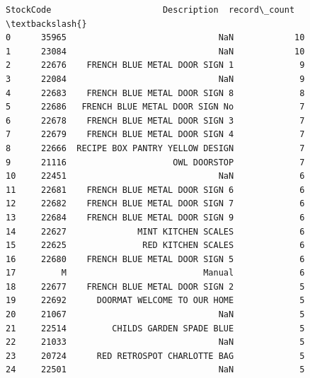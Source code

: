 \documentclass[11pt]{article}
\begin{document}
    
    \begin{Verbatim}[commandchars=\\\{\}]
   StockCode                      Description  record\_count  \textbackslash{}
0      35965                              NaN            10   
1      23084                              NaN            10   
2      22676    FRENCH BLUE METAL DOOR SIGN 1             9   
3      22084                              NaN             9   
4      22683    FRENCH BLUE METAL DOOR SIGN 8             8   
5      22686   FRENCH BLUE METAL DOOR SIGN No             7   
6      22678    FRENCH BLUE METAL DOOR SIGN 3             7   
7      22679    FRENCH BLUE METAL DOOR SIGN 4             7   
8      22666  RECIPE BOX PANTRY YELLOW DESIGN             7   
9      21116                     OWL DOORSTOP             7   
10     22451                              NaN             6   
11     22681    FRENCH BLUE METAL DOOR SIGN 6             6   
12     22682    FRENCH BLUE METAL DOOR SIGN 7             6   
13     22684    FRENCH BLUE METAL DOOR SIGN 9             6   
14     22627              MINT KITCHEN SCALES             6   
15     22625               RED KITCHEN SCALES             6   
16     22680    FRENCH BLUE METAL DOOR SIGN 5             6   
17         M                           Manual             6   
18     22677    FRENCH BLUE METAL DOOR SIGN 2             5   
19     22692      DOORMAT WELCOME TO OUR HOME             5   
20     21067                              NaN             5   
21     22514         CHILDS GARDEN SPADE BLUE             5   
22     21033                              NaN             5   
23     20724      RED RETROSPOT CHARLOTTE BAG             5   
24     22501                              NaN             5   


\end{Verbatim}
\end{document}
